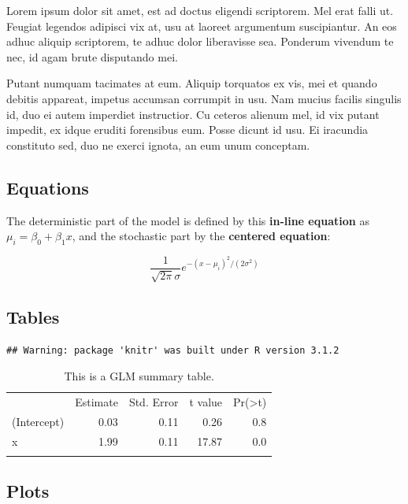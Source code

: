 \documentclass[]{article}
\begin{document}
Lorem ipsum dolor sit amet, est ad doctus eligendi scriptorem. Mel erat
falli ut. Feugiat legendos adipisci vix at, usu at laoreet argumentum
suscipiantur. An eos adhuc aliquip scriptorem, te adhuc dolor
liberavisse sea. Ponderum vivendum te nec, id agam brute disputando mei.

Putant numquam tacimates at eum. Aliquip torquatos ex vis, mei et quando
debitis appareat, impetus accumsan corrumpit in usu. Nam mucius facilis
singulis id, duo ei autem imperdiet instructior. Cu ceteros alienum mel,
id vix putant impedit, ex idque eruditi forensibus eum. Posse dicunt id
usu. Ei iracundia constituto sed, duo ne exerci ignota, an eum unum
conceptam.

\subsection{Equations}\label{equations}

The deterministic part of the model is defined by this \textbf{in-line
equation} as $\mu_i = \beta_0 + \beta_1x$, and the stochastic part by
the \textbf{centered equation}:

\[ \frac{1}{\sqrt{2\pi}\sigma}e^{-(x-\mu_i)^2/(2\sigma^2)} \]

\subsection{Tables}\label{tables}

\begin{verbatim}
## Warning: package 'knitr' was built under R version 3.1.2
\end{verbatim}

\begin{longtable}[c]{@{}lrrrr@{}}
\toprule\addlinespace
& Estimate & Std. Error & t value &
Pr(\textgreater{}\textbar{}t\textbar{})
\\\addlinespace
\midrule\endhead
(Intercept) & 0.03 & 0.11 & 0.26 & 0.8
\\\addlinespace
x & 1.99 & 0.11 & 17.87 & 0.0
\\\addlinespace
\bottomrule
\addlinespace
\caption{This is a GLM summary table.}
\end{longtable}

\subsection{Plots}\label{plots}
\end{document}
